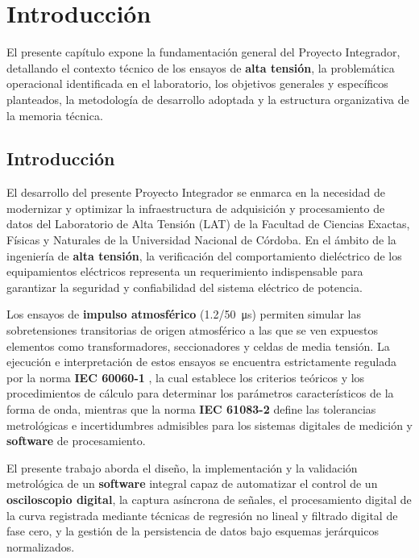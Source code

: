 \newpage

\chapter{Introducción} \label{ch:introduccion}

\vspace{3\baselineskip}

El presente capítulo expone la fundamentación general del Proyecto Integrador, detallando el contexto técnico de los ensayos de \textbf{alta tensión}, la problemática operacional identificada en el laboratorio, los objetivos generales y específicos planteados, la metodología de desarrollo adoptada y la estructura organizativa de la memoria técnica.

\section{Introducción} \label{sec:introduccion_gral}

El desarrollo del presente Proyecto Integrador se enmarca en la necesidad de modernizar y optimizar la infraestructura de adquisición y procesamiento de datos del Laboratorio de Alta Tensión (LAT) de la Facultad de Ciencias Exactas, Físicas y Naturales de la Universidad Nacional de Córdoba. En el ámbito de la ingeniería de \textbf{alta tensión}, la verificación del comportamiento dieléctrico de los equipamientos eléctricos representa un requerimiento indispensable para garantizar la seguridad y confiabilidad del sistema eléctrico de potencia.

Los ensayos de \textbf{impulso atmosférico} (\qty[parse-numbers=false]{1.2/50}{\micro\second}) permiten simular las sobretensiones transitorias de origen atmosférico a las que se ven expuestos elementos como transformadores, seccionadores y celdas de media tensión. La ejecución e interpretación de estos ensayos se encuentra estrictamente regulada por la norma \textbf{IEC 60060-1} \cite{iec60060_1}, la cual establece los criterios teóricos y los procedimientos de cálculo para determinar los parámetros característicos de la forma de onda, mientras que la norma \textbf{IEC 61083-2} \cite{iec61083_2} define las tolerancias metrológicas e incertidumbres admisibles para los sistemas digitales de medición y \textbf{software} de procesamiento.

El presente trabajo aborda el diseño, la implementación y la validación metrológica de un \textbf{software} integral capaz de automatizar el control de un \textbf{osciloscopio digital}, la captura asíncrona de señales, el procesamiento digital de la curva registrada mediante técnicas de regresión no lineal y filtrado digital de fase cero, y la gestión de la persistencia de datos bajo esquemas jerárquicos normalizados.

